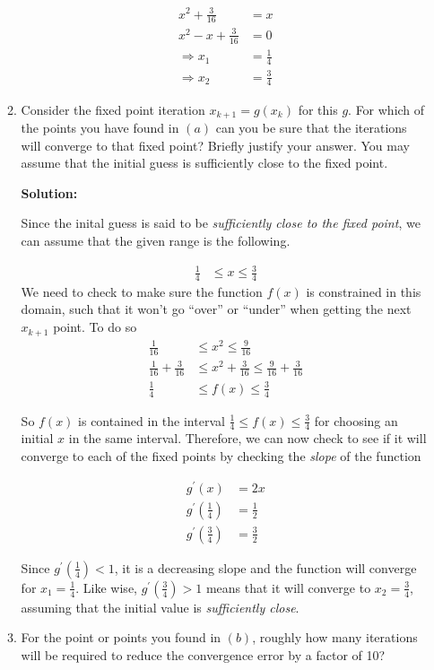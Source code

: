 \documentclass[12pt]{article}
\begin{document}
\begin{enumerate}
\begin{enumerate}
  \begin{align*}
    x^{2} + \frac{3}{16} &= x\\
    x^{2} - x + \frac{3}{16} &= 0\\
    \Rightarrow x_{1} &= \frac{1}{4}\\
    \Rightarrow x_{2} &= \frac{3}{4}
  \end{align*}
  \item Consider the fixed point iteration $x_{k+1} = g\left( x_{k}\right)$ for this $g$.
  For which of the points you have found in $(a)$ can you be sure that the iterations
  will converge to that fixed point? Briefly justify your answer. You may assume that
  the initial guess is sufficiently close to the fixed point.

{\bf Solution:}

  Since the inital guess is said to be {\em sufficiently close to the fixed point},
  we can assume that the given range is the following.

  \begin{align*}
    \frac{1}{4} &\leq x \leq \frac{3}{4}
  \end{align*}
  We need to check to make sure the function $f(x)$ is constrained in this domain, such that it won't go ``over'' or ``under'' when getting the next $x_{k+1}$ point. To do so
  \begin{align*}
    \frac{1}{16} &\leq x^{2} \leq \frac{9}{16}\\
    \frac{1}{16} + \frac{3}{16} &\leq x^{2} + \frac{3}{16} \leq \frac{9}{16} + \frac{3}{16}\\
    \frac{1}{4} &\leq f(x) \leq \frac{3}{4}
    \end{align*}

    So $f(x)$ is contained in the interval $\frac{1}{4} \leq f(x) \leq \frac{3}{4}$ for
    choosing an initial $x$ in the same interval. Therefore, we can now check to see if it will
    converge to each of the fixed points by checking the {\em slope} of the function

    \begin{align*}
      g^{\prime}(x) &= 2x\\
      g^{\prime}\left(\frac{1}{4}\right) &= \frac{1}{2}\\
      g^{\prime}\left(\frac{3}{4}\right) &= \frac{3}{2}
    \end{align*}

    Since $g^{\prime}\left(\frac{1}{4}\right) < 1$, it is a decreasing slope and the function will converge
    for $x_{1} = \frac{1}{4}$. Like wise, $g^{\prime}\left(\frac{3}{4}\right) > 1$ means that it will converge
    to $x_{2} = \frac{3}{4}$, assuming that the initial value is {\em sufficiently close}.
  \item For the point or points you found in $(b)$, roughly how many iterations will be
  required to reduce the convergence error by a factor of 10?


\end{enumerate}
\end{enumerate}
\end{document}
